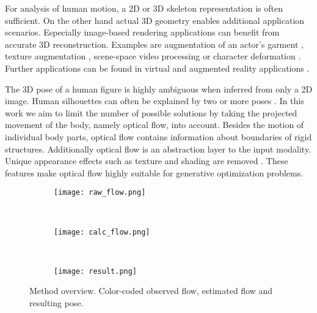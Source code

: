 \documentclass[10pt,twocolumn,letterpaper]{article}
\begin{document}
For analysis of human motion, a 2D or 3D skeleton representation is often sufficient. On the other hand actual 3D geometry enables additional application scenarios. Especially image-based rendering applications can benefit from accurate 3D reconstruction. Examples are augmentation of an actor's garment \cite{rogge2014garment}, texture augmentation \cite{rav2008unwrap}, scene-space video processing \cite{klose2015sampling} or character deformation  \cite{jain2010moviereshape,zhou2010parametric}. Further applications can be found in virtual and augmented reality applications \cite{hauswiesner2013virtual}.

The 3D pose of a human figure is highly ambiguous when inferred from only a 2D image. Human silhouettes can often be explained by two or more poses \cite{guan2009estimating}. In this work we aim to limit the number of possible solutions by taking the projected movement of the body, namely optical flow, into account. Besides the motion of individual body parts, optical flow contains information about boundaries of rigid structures. Additionally optical flow is an abstraction layer to the input modality. Unique appearance effects such as texture and shading are removed \cite{fablet2002automatic,romero2015flowcap}. These features make optical flow highly suitable for generative optimization problems.



\begin{figure}
	\centering
	\begin{subfigure}[b]{0.33\columnwidth}
		\texttt{[image: raw\_flow.png]}
	\end{subfigure}%
	~
	\begin{subfigure}[b]{0.33\columnwidth}
		\texttt{[image: calc\_flow.png]}
	\end{subfigure}%
	~
	\begin{subfigure}[b]{0.33\columnwidth}
		\texttt{[image: result.png]}
	\end{subfigure}
	\caption{Method overview. Color-coded observed flow, estimated flow and resulting pose.}
	\label{fig:observedvsoptimized}
\end{figure}
\end{document}
